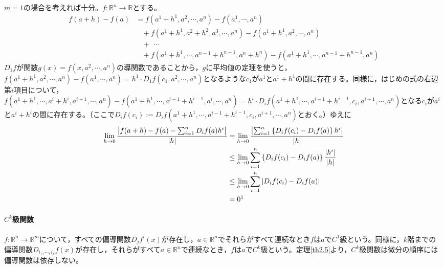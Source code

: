 \documentclass[dvipdfmx,a4j,10pt]{jsarticle}
\makeatletter
\theoremstyle{mystyle1}
\theoremstyle{mystyle2}
\renewenvironment{proof}[1][\proofname]{\par
  \pushQED{\qed}%
  \normalfont
  \topsep6\p@\@plus6\p@ \trivlist
  \item[\hskip\labelsep{\bfseries\sffamily #1}]\ignorespaces
}{%
  \popQED\endtrivlist\@endpefalse
}
\renewcommand\proofname{証明}
\makeatother
\begin{document}
\begin{proof}
	$m=1$の場合を考えれば十分\footnotemark。$f:\mathbb{R}^n\to\mathbb{R}$とする。
	\[
	\begin{split}
	f(a+h)-f(a)&=f(a^1+h^1,a^2,\cdots,a^n)-f(a^1,\cdots,a^n)\\
	&\ \ \ \ +f(a^1+h^1,a^2+h^2,a^3,\cdots,a^n)-f(a^1+h^1,a^2,\cdots,a^n)\\
	&\ \ \ \ +\ \ \cdots \\
	&\ \ \ \ +f(a^1+h^1,\cdots,a^{n-1}+h^{n-1},a^n+h^n)-f(a^1+h^1,\cdots,a^{n-1}+h^{n-1},a^n)
	\end{split}
	\]
	$D_1f$が関数$g(x)=f(x,a^2,\cdots,a^n)$の導関数であることから，$g$に平均値の定理を使うと，$f(a^1+h^1,a^2,\cdots,a^n)-f(a^1,\cdots,a^n)=h^1\cdot D_1f(c_1,a^2,\cdots,a^n)$となるような$c_1$が$a^1$と$a^1+h^1$の間に存在する。同様に，はじめの式の右辺第$i$項目について，$f(a^1+h^1,\cdots,a^i+h^i,a^{i+1},\cdots,a^n)-f(a^1+h^1,\cdots,a^{i-1}+h^{i-1},a^i,\cdots,a^n)=h^i\cdot D_if(a^1+h^1,\cdots,a^{i-1}+h^{i-1},c_i,a^{i+1},\cdots,a^n)$となる$c_i$が$a^i$と$a^i+h^i$の間に存在する。（ここで$D_if(c_i):= D_if(a^1+h^1,\cdots,a^{i-1}+h^{i-1},c_i,a^{i+1},\cdots,a^n)$とおく。）ゆえに
	\[
	\begin{split}
		\lim_{h\to0}\frac{\left|f(a+h)-f(a)-\sum_{i=1}^nD_if(a)h^i\right|}{|h|}
		&=\lim_{h\to0}\frac{\left|\sum_{i=1}^n\left\{D_if(c_i)-D_if(a)\right\}h^i\right|}{|h|}\\
		&\leq\lim_{h\to0}\sum_{i=1}^n\left\{D_if(c_i)-D_if(a)\right\}\frac{|h^i|}{|h|}\\
		&\leq\lim_{h\to0}\sum_{i=1}^n|D_if(c_i)-D_if(a)|\\
		&=0\footnotemark
	\end{split}
	\]
\end{proof}


\newpage

\paragraph{$C^k$級関数}
$f:\mathbb{R}^n\to\mathbb{R}^m$について，すべての偏導関数$D_jf^i(x)$が存在し，$a\in\mathbb{R}^n$でそれらがすべて連続なとき$f$は$a$で$C^1$級という。同様に，$k$階までの　偏導関数$D_{i_1,\cdots,i_k}f(x)$が存在し，それらがすべて$a\in\mathbb{R}^n$で連続なとき，$f$は$a$で$C^k$級という。定理\ref{th2.5}より，$C^k$級関数は微分の順序には偏導関数は依存しない。
\end{document}
